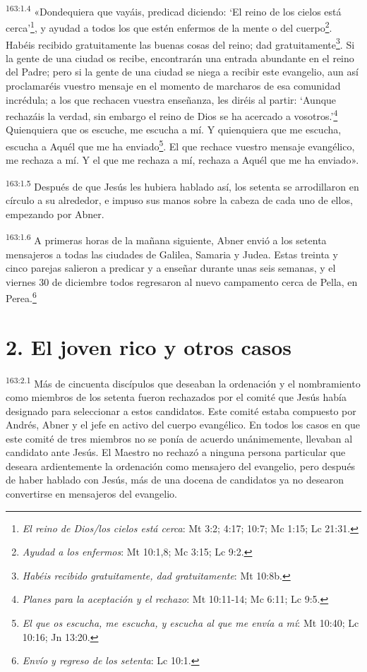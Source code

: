 \par
\textsuperscript{163:1.4} «Dondequiera que vayáis, predicad diciendo: `El reino de los cielos está cerca'\footnote{\textit{El reino de Dios/los cielos está cerca}: Mt 3:2; 4:17; 10:7; Mc 1:15; Lc 21:31.}, y ayudad a todos los que estén enfermos de la mente o del cuerpo\footnote{\textit{Ayudad a los enfermos}: Mt 10:1,8; Mc 3:15; Lc 9:2.}. Habéis recibido gratuitamente las buenas cosas del reino; dad gratuitamente\footnote{\textit{Habéis recibido gratuitamente, dad gratuitamente}: Mt 10:8b.}. Si la gente de una ciudad os recibe, encontrarán una entrada abundante en el reino del Padre; pero si la gente de una ciudad se niega a recibir este evangelio, aun así proclamaréis vuestro mensaje en el momento de marcharos de esa comunidad incrédula; a los que rechacen vuestra enseñanza, les diréis al partir: `Aunque rechazáis la verdad, sin embargo el reino de Dios se ha acercado a vosotros.'\footnote{\textit{Planes para la aceptación y el rechazo}: Mt 10:11-14; Mc 6:11; Lc 9:5.} Quienquiera que os escuche, me escucha a mí. Y quienquiera que me escucha, escucha a Aquél que me ha enviado\footnote{\textit{El que os escucha, me escucha, y escucha al que me envía a mí}: Mt 10:40; Lc 10:16; Jn 13:20.}. El que rechace vuestro mensaje evangélico, me rechaza a mí. Y el que me rechaza a mí, rechaza a Aquél que me ha enviado».

\par
\textsuperscript{163:1.5} Después de que Jesús les hubiera hablado así, los setenta se arrodillaron en círculo a su alrededor, e impuso sus manos sobre la cabeza de cada uno de ellos, empezando por Abner.

\par
\textsuperscript{163:1.6} A primeras horas de la mañana siguiente, Abner envió a los setenta mensajeros a todas las ciudades de Galilea, Samaria y Judea. Estas treinta y cinco parejas salieron a predicar y a enseñar durante unas seis semanas, y el viernes 30 de diciembre todos regresaron al nuevo campamento cerca de Pella, en Perea.\footnote{\textit{Envío y regreso de los setenta}: Lc 10:1.}

\section*{2. El joven rico y otros casos}
\par
\textsuperscript{163:2.1} Más de cincuenta discípulos que deseaban la ordenación y el nombramiento como miembros de los setenta fueron rechazados por el comité que Jesús había designado para seleccionar a estos candidatos. Este comité estaba compuesto por Andrés, Abner y el jefe en activo del cuerpo evangélico. En todos los casos en que este comité de tres miembros no se ponía de acuerdo unánimemente, llevaban al candidato ante Jesús. El Maestro no rechazó a ninguna persona particular que deseara ardientemente la ordenación como mensajero del evangelio, pero después de haber hablado con Jesús, más de una docena de candidatos ya no desearon convertirse en mensajeros del evangelio.

